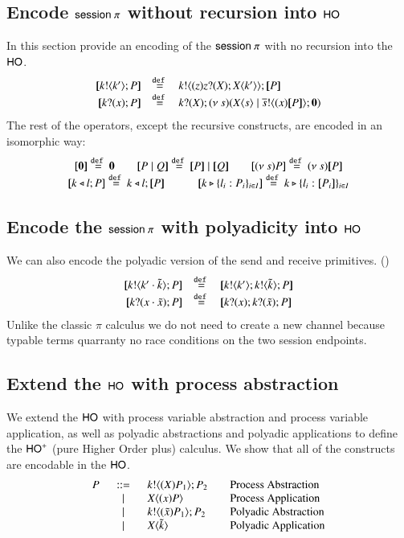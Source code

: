 \subsection{Encode $\mathsf{session\ }\pi$ without recursion into $\mathsf{HO}$ \label{ss:encnr}}
In this section provide an encoding of the
$\mathsf{session\ }\pi$ with no recursion into the $\mathsf{HO}$.
%
\[
	\begin{array}{rcl}
		\map{\bout{k}{k'} P}	&\defeq&	\bout{k}{ \abs{z}{\binp{z}{X} \appl{X}{k'}} } \map{P} \\
		\map{\binp{k}{x} P}	&\defeq&	\binp{k}{X} \newsp{s}{\appl{X}{s} \Par \bout{\dual{s}}{\abs{x} \map{P}} \inact}\\
	\end{array}
\]
%
The rest of the operators, except the recursive constructs, are encoded in an isomorphic way:
\[
	\begin{array}{c}
		\map{\inact} \defeq \inact \qquad \map{P\Par Q} \defeq \map{P} \Par \map{Q} \qquad \map{\news{s} P} \defeq \news{s} \map{P}\\
		\map{\bsel{k}{l} P} \defeq \bsel{k}{l} \map{P} \qquad \quad \map{\bbra{k}{l_i:P_i}_{i \in I}} \defeq \bbra{k}{l_i: \map{P_i}}_{i \in I}
	\end{array}
\]
%
\subsection{Encode the $\mathsf{session\ }\pi$ with polyadicity into $\mathsf{HO}$ \label{ss:encpp}}
We can also encode the polyadic version of the send and receive primitives. ()
%
\[
	\begin{array}{rcl}
		\map{\bout{k}{k' \cat \tilde{k}} P}	&\defeq&	\map{\bout{k}{k'} \bout{k}{\tilde{k}} P}\\
		\map{\binp{k}{x \cat \tilde{x}} P}	&\defeq&	\map{\binp{k}{x} \binp{k}{\tilde{x}} P}\\
	\end{array}
\]
%
Unlike the classic $\pi$ calculus we do not need to create a new channel because typable terms
quarranty no race conditions on the two session endpoints.

\subsection{Extend the $\mathsf{HO}$ with process abstraction\label{ss:encpa}}

We extend the $\mathsf{HO}$ with process variable abstraction and process variable application,
as well as polyadic abstractions and polyadic applications to define the
$\mathsf{HO}^+$ (pure Higher Order plus) calculus. We show that all of the
constructs are encodable in the $\mathsf{HO}$.
%
\[
	\begin{array}{rclcl}
		P &\;\;::=\;\;&	k ! \langle (X)P_1 \rangle ; P_2 & & \textrm{Process Abstraction}\\
		&\;\;\;|\;\;\;&	X\langle (x)P \rangle & & \textrm{Process Application} \\
		&\;\;\;|\;\;\;&	k ! \langle (\tilde{x})P_1 \rangle ; P_2 & & \textrm{Polyadic Abstraction}\\
		&\;\;\;|\;\;\;&	X\langle \tilde{k} \rangle & & \textrm{Polyadic Application}\\
	\end{array}
\]
